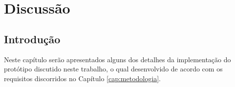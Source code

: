 
\chapter{Discussão}
\label{cap:discussão}

\section{Introdução}
Neste capítulo serão apresentados alguns dos detalhes da implementação do protótipo discutido neste trabalho, o qual desenvolvido de acordo com os requisitos discorridos no Capítulo \ref{cap:metodologia}.
